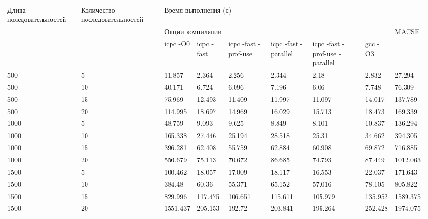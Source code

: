 \begin{landscape}
\begin{table}[htbp]
\caption{Результаты тестирования}
\begin{longtable}{|*{2}{p{3.5cm}|}*{2}{p{1.8cm}|}*{3}{p{2.8cm}|}*{2}{p{1.8cm}|}}
\hline
\multicolumn{ 1}{|p{3.5cm}|}{Длина поледовательностей} & \multicolumn{ 1}{p{3.5cm}|}{Количество последовательностей} & \multicolumn{ 7}{p{15.6cm}|}{Время выполнения (с)} \\ \cline{ 3- 9}
\multicolumn{ 1}{|p{3.5cm}|}{} & \multicolumn{ 1}{p{3.5cm}|}{} & \multicolumn{ 6}{p{10.8cm}|}{Опции компиляции } & \multicolumn{ 1}{p{1.8cm}|}{MACSE} \\ \cline{ 3- 8}
\multicolumn{ 1}{|p{3.5cm}|}{} & \multicolumn{ 1}{p{3.5cm}|}{} & \multicolumn{1}{p{1.8cm}|}{icpc -O0} & \multicolumn{1}{p{1.8cm}|}{icpc -fast} & \multicolumn{1}{p{1.8cm}|}{icpc  -fast -prof-use} & \multicolumn{1}{p{1.8cm}|}{icpc -fast -parallel} & \multicolumn{1}{p{1.8cm}|}{icpc -fast -prof-use -parallel} & \multicolumn{1}{p{1.8cm}|}{gcc -O3} & \multicolumn{ 1}{p{1.8cm}|}{} \\ \hline
500 & 5 & 11.857 & 2.364 & 2.256 & 2.344 & 2.18 & 2.832 & 27.294 \\ \hline
500 & 10 & 40.171 & 6.724 & 6.096 & 7.196 & 6.06 & 7.748 & 76.309 \\ \hline
500 & 15 & 75.969 & 12.493 & 11.409 & 11.997 & 11.097 & 14.017 & 137.789 \\ \hline
500 & 20 & 114.995 & 18.697 & 14.969 & 16.029 & 15.713 & 18.473 & 169.339 \\ \hline
1000 & 5 & 48.759 & 9.093 & 9.625 & 8.849 & 8.101 & 10.837 & 136.294 \\ \hline
1000 & 10 & 165.338 & 27.446 & 25.194 & 28.518 & 25.31 & 34.662 & 394.305 \\ \hline
1000 & 15 & 396.281 & 62.408 & 55.759 & 62.884 & 60.908 & 69.872 & 716.885 \\ \hline
1000 & 20 & 556.679 & 75.113 & 70.672 & 86.685 & 74.793 & 87.449 & 1012.063 \\ \hline
1500 & 5 & 100.462 & 18.057 & 17.009 & 18.117 & 16.553 & 22.037 & 171.643 \\ \hline
1500 & 10 & 384.48 & 60.36 & 55.371 & 65.152 & 57.016 & 78.105 & 805.822 \\ \hline
1500 & 15 & 829.996 & 117.475 & 106.651 & 115.611 & 105.979 & 135.952 & 1589.375 \\ \hline
1500 & 20 & 1551.437 & 205.153 & 192.72 & 203.841 & 196.264 & 252.428 & 1974.075 \\ \hline

\end{longtable}
\end{table}
\end{landscape}
